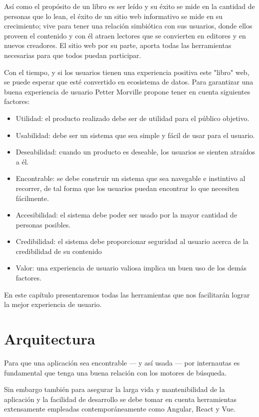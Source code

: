 Así como el propósito de un libro es ser leído y su éxito se mide en la cantidad de personas que lo lean, el éxito de un sitio web informativo se mide en su crecimiento; vive para tener una relación simbiótica con sus usuarios, donde ellos proveen el contenido y con él atraen lectores que se convierten en editores y en nuevos creadores. El sitio web por su parte, aporta todas las herramientas necesarias para que todos puedan participar.

Con el tiempo, y si los usuarios tienen una experiencia positiva este "libro" web, se puede esperar que esté convertido en ecosistema de datos. Para garantizar una buena experiencia de usuario Petter Morville \cite{UXFactors} propone tener en cuenta siguientes factores:

\begin{itemize}
  \item Utilidad: el producto realizado debe ser de utilidad para el público objetivo.
  \item Usabilidad: debe ser un sistema que sea simple y fácil de usar para el usuario.
  \item Deseabilidad: cuando un producto es deseable, los usuarios se sienten atraídos a él.
  \item Encontrable: se debe construir un sistema que sea navegable e instintivo al recorrer, de tal forma que los usuarios puedan encontrar lo que necesiten fácilmente.
  \item Accesibilidad: el sistema debe poder ser usado por la mayor cantidad de personas posibles.
  \item Credibilidad: el sistema debe proporcionar seguridad al usuario acerca de la credibilidad de su contenido
  \item Valor: una experiencia de usuario valiosa implica un buen uso de los demás factores.
\end{itemize}

En este capítulo presentaremos todas las herramientas que nos facilitarán lograr la mejor experiencia de usuario.

\section{Arquitectura}

Para que una aplicación sea encontrable — y así usada — por internautas es fundamental que tenga una buena relación con los motores de búsqueda.

Sin embargo también para asegurar la larga vida y mantenibilidad de la aplicación y la facilidad de desarrollo se debe tomar en cuenta herramientas extensamente empleadas contemporáneamente como Angular, React y Vue.

